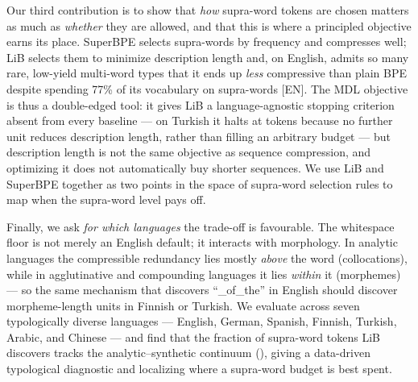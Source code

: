 Our third contribution is to show that \emph{how} supra-word tokens are chosen
matters as much as \emph{whether} they are allowed, and that this is where a
principled objective earns its place.  SuperBPE selects supra-words by
frequency and compresses well; LiB selects them to minimize description length
and, on English, admits so many rare, low-yield multi-word types that it ends
up \emph{less} compressive than plain BPE despite spending 77\% of its
vocabulary on supra-words [EN].  The MDL objective is thus a double-edged tool:
it gives LiB a language-agnostic stopping criterion absent from every baseline
— on Turkish it halts at  tokens because no further unit reduces
description length, rather than filling an arbitrary budget — but description
length is not the same objective as sequence compression, and optimizing it
does not automatically buy shorter sequences.  We use LiB and SuperBPE together
as two points in the space of supra-word selection rules to map when the
supra-word level pays off.

Finally, we ask \emph{for which languages} the trade-off is favourable.
The whitespace floor is not merely an English default; it interacts with
morphology.  In analytic languages the compressible redundancy lies mostly
\emph{above} the word (collocations), while in agglutinative and compounding
languages it lies \emph{within} it (morphemes) — so the same mechanism that
discovers ``\_of\_the'' in English should discover morpheme-length units in
Finnish or Turkish.  We evaluate across seven typologically diverse languages
— English, German, Spanish, Finnish, Turkish, Arabic, and Chinese — and find
that the fraction of supra-word tokens LiB discovers tracks the
analytic--synthetic continuum (), giving a data-driven
typological diagnostic and localizing where a supra-word budget is best spent.

